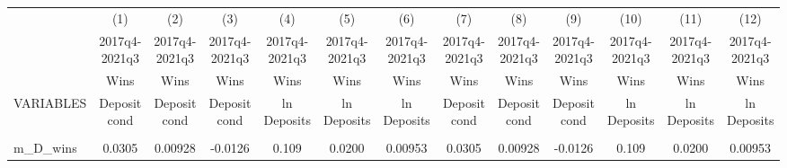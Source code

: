 \documentclass[]{article}
\begin{document}
\begin{center}
\begin{tabular}{lcccccccccccc} \hline
 & (1) & (2) & (3) & (4) & (5) & (6) & (7) & (8) & (9) & (10) & (11) & (12) \\
 & 2017q4-2021q3 & 2017q4-2021q3 & 2017q4-2021q3 & 2017q4-2021q3 & 2017q4-2021q3 & 2017q4-2021q3 & 2017q4-2021q3 & 2017q4-2021q3 & 2017q4-2021q3 & 2017q4-2021q3 & 2017q4-2021q3 & 2017q4-2021q3 \\
 & Wins & Wins & Wins & Wins & Wins & Wins & Wins & Wins & Wins & Wins & Wins & Wins \\
VARIABLES & Deposit cond & Deposit cond & Deposit cond & ln Deposits & ln Deposits & ln Deposits & Deposit cond & Deposit cond & Deposit cond & ln Deposits & ln Deposits & ln Deposits \\ \hline
\vspace{4pt} & \begin{footnotesize}\end{footnotesize} & \begin{footnotesize}\end{footnotesize} & \begin{footnotesize}\end{footnotesize} & \begin{footnotesize}\end{footnotesize} & \begin{footnotesize}\end{footnotesize} & \begin{footnotesize}\end{footnotesize} & \begin{footnotesize}\end{footnotesize} & \begin{footnotesize}\end{footnotesize} & \begin{footnotesize}\end{footnotesize} & \begin{footnotesize}\end{footnotesize} & \begin{footnotesize}\end{footnotesize} & \begin{footnotesize}\end{footnotesize} \\
m\_D\_wins & 0.0305 & 0.00928 & -0.0126 & 0.109 & 0.0200 & 0.00953 & 0.0305 & 0.00928 & -0.0126 & 0.109 & 0.0200 & 0.00953 \\

\end{tabular}
\end{center}
\end{document}
